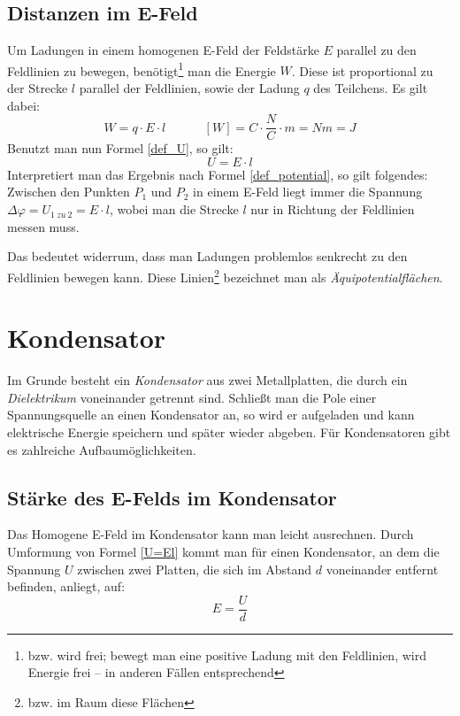 		\section{Distanzen im E-Feld}
Um Ladungen in einem homogenen E-Feld der Feldstärke \(E\) parallel zu den Feldlinien zu bewegen, benötigt\footnote{bzw. wird frei; bewegt man eine positive Ladung mit den Feldlinien, wird Energie frei -- in anderen Fällen entsprechend} 
man die Energie \(W\). Diese ist proportional zu der Strecke \(l\) parallel der Feldlinien, sowie der Ladung \(q\) des Teilchens. Es gilt dabei: 
	\begin{equation}
	W = q \cdot E \cdot l ~~~~~~~~~~~~~~ [W] = C \cdot \frac{N}{C} \cdot m = Nm = J
	\label{W_kondensator}
	\end{equation}
Benutzt man nun Formel \ref{def_U}, so gilt:
	\begin{equation}
	U = E \cdot l
	\label{U=El}
	\end{equation}
Interpretiert man das Ergebnis nach Formel \ref{def_potential}, so gilt folgendes: Zwischen den Punkten \(P_{1}\) und \(P_2\) in einem E-Feld liegt immer die Spannung \(\Delta\varphi = U_{1~zu~2} = E \cdot l\), wobei man die Strecke \(l\) nur in Richtung der Feldlinien messen muss.

Das bedeutet widerrum, dass man Ladungen problemlos senkrecht zu den Feldlinien bewegen kann. Diese Linien\footnote{bzw. im Raum diese Flächen} bezeichnet man als \textit{Äquipotentialflächen}.



		\chapter{Kondensator}

Im Grunde besteht ein \emph{Kondensator} aus zwei Metallplatten, die durch ein \emph{Dielektrikum} voneinander getrennt sind. Schließt man die Pole einer Spannungsquelle an einen Kondensator an, so wird er aufgeladen und kann elektrische Energie speichern und später wieder abgeben. Für Kondensatoren gibt es zahlreiche Aufbaumöglichkeiten.



		\section{Stärke des E-Felds im Kondensator}
Das Homogene E-Feld im Kondensator kann man leicht ausrechnen. Durch Umformung von Formel \ref{U=El} kommt man für einen Kondensator, an dem die Spannung \(U\) zwischen zwei Platten, die sich im Abstand \(d\) voneinander entfernt befinden, anliegt,  auf:
	\begin{equation}
	E = \frac{U}{d}
	\label{E_kondensator}
	\end{equation}


